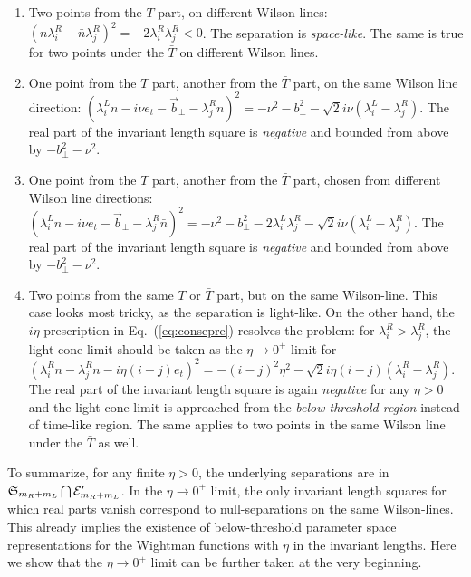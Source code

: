 \documentclass[a4paper,11pt]{article}
\begin{document}
\begin{enumerate}
    \item Two points from the $T$ part, on different Wilson lines: $(n\lambda^R_i-\bar n\lambda^R_j)^2=-2\lambda ^R_i\lambda^R_j<0$. The separation is {\it space-like}.  The same is true for two points under the $\bar T$ on different Wilson lines.
    \item One point from the $T$ part, another from the $\bar T$ part, on the same Wilson line direction: $(\lambda^L_in-i\nu e_t-\vec{b}_\perp-\lambda^R_j n)^2=-\nu^2-b_\perp^2-\sqrt{2}i\nu(\lambda^L_i-\lambda^R_j)$. The real part of the invariant length square
 is {\it negative} and bounded from above by $-b_\perp^2-\nu^2$.
    \item One point from the $T$ part, another from the $\bar T$ part, chosen from  different Wilson line directions: $(\lambda^L_in-i\nu e_t-\vec{b}_\perp-\lambda^R_j \bar n)^2=-\nu^2-b_\perp^2-2\lambda_i^L\lambda^R_j-\sqrt{2}i\nu (\lambda_i^L-\lambda^R_j)$. The real part of the invariant length square is {\it negative} and bounded from above by $-b_\perp^2-\nu^2$.
    \item Two points from the same $T$ or $\bar T$ part, but on the same Wilson-line. This case looks most tricky, as the separation is  light-like. On the other hand, the $i\eta$ prescription in Eq.~(\ref{eq:consepre}) resolves the problem: for $\lambda^R_i>\lambda^R_j$, the light-cone limit should be taken as the $\eta \rightarrow 0^+$ limit for $(\lambda^R_i n-\lambda^R_j n-i\eta(i-j) e_t)^2=-(i-j)^2\eta^2-\sqrt{2}i\eta(i-j)(\lambda^R_i-\lambda^R_j)$. The real part of the invariant length square is again {\it negative} for any $\eta>0$ and the light-cone limit is approached from the {\it below-threshold region} instead of time-like region. The same applies to two points in the same Wilson line under the $\bar T$ as well.
\end{enumerate}
To summarize,  for any finite $\eta>0$, the underlying separations are in $\mathfrak{S}_{m_R+m_L} \bigcap {\cal E}'_{m_R+m_L}$. In the $\eta \rightarrow 0^+$ limit, the only invariant length squares for which real parts vanish correspond to null-separations on the same Wilson-lines.  This already implies the existence of below-threshold parameter space representations for the Wightman functions with $\eta$ in the invariant lengths. Here we show that the $\eta \rightarrow 0^+$ limit can be further taken at the very beginning. 
\end{document}

